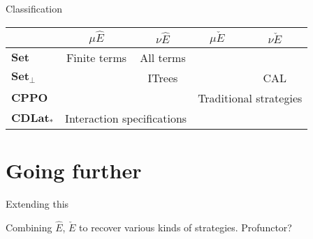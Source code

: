\documentclass{beamer}
\newcommand{\cat}[1]{\mathbf{#1}}
\begin{document}
\begin{frame}[fragile]{Classification}
\begin{tabular}{l|c|c|c|c|}
  & $\mu \hat{E}$ & $\nu \hat{E}$ & $\mu \check{E}$ & $\nu \check{E}$ \\
  \hline
  $\cat{Set}$ & Finite terms & All terms & & \\
  \hline
  $\cat{Set}_\bot$ & & ITrees & & CAL \\
  \hline
  $\cat{CPPO}$ & \multicolumn{2}{c|}{} & \multicolumn{2}{c|}{Traditional strategies} \\
  \hline
  $\cat{CDLat}_*$ & \multicolumn{2}{c|}{Interaction specifications} & \multicolumn{2}{c|}{} \\
  \hline
\end{tabular}
\end{frame}

\section{Going further}

\begin{frame}{Extending this}

Combining $\hat{E}$, $\check{E}$
to recover various kinds of strategies.
Profunctor?

\end{frame}
\end{document}
